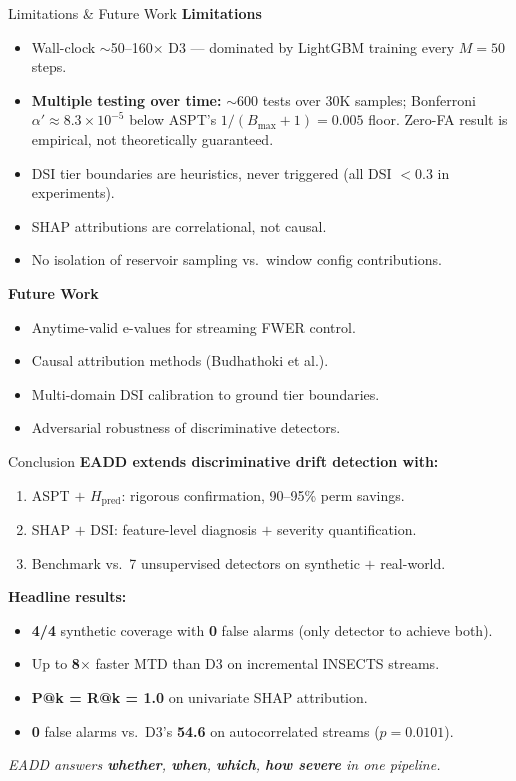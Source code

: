 \documentclass[aspectratio=169,10pt]{beamer}
\begin{document}
\begin{frame}{Limitations \& Future Work}
\textbf{Limitations}
\begin{itemize}\small
\item Wall-clock $\sim$50--160$\times$ D3 — dominated by LightGBM training every $M{=}50$ steps.
\item \textbf{Multiple testing over time:} $\sim$600 tests over 30K samples; Bonferroni $\alpha'{\approx}8.3{\times}10^{-5}$ below ASPT's $1/(B_{\max}{+}1){=}0.005$ floor. Zero-FA result is empirical, not theoretically guaranteed.
\item DSI tier boundaries are heuristics, never triggered (all DSI $<0.3$ in experiments).
\item SHAP attributions are correlational, not causal.
\item No isolation of reservoir sampling vs.\ window config contributions.
\end{itemize}

\medskip
\textbf{Future Work}
\begin{itemize}\small
\item Anytime-valid e-values for streaming FWER control.
\item Causal attribution methods (Budhathoki et al.).
\item Multi-domain DSI calibration to ground tier boundaries.
\item Adversarial robustness of discriminative detectors.
\end{itemize}
\end{frame}

\begin{frame}{Conclusion}
\textbf{EADD extends discriminative drift detection with:}
\begin{enumerate}
\item ASPT $+$ $H_{\mathrm{pred}}$: rigorous confirmation, 90--95\% perm savings.
\item SHAP $+$ DSI: feature-level diagnosis $+$ severity quantification.
\item Benchmark vs.\ 7 unsupervised detectors on synthetic $+$ real-world.
\end{enumerate}

\medskip
\textbf{Headline results:}
\begin{itemize}
\item \textbf{4/4} synthetic coverage with \textbf{0} false alarms (only detector to achieve both).
\item Up to \textbf{8$\times$} faster MTD than D3 on incremental INSECTS streams.
\item \textbf{P@k = R@k = 1.0} on univariate SHAP attribution.
\item \textbf{0} false alarms vs.\ D3's \textbf{54.6} on autocorrelated streams ($p{=}0.0101$).
\end{itemize}

\medskip
\centering
\textit{EADD answers \textbf{whether}, \textbf{when}, \textbf{which}, \textbf{how severe} in one pipeline.}
\end{frame}
\end{document}
